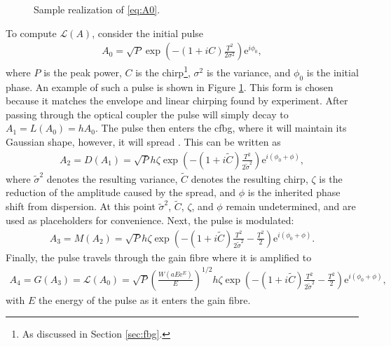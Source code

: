 \begin{figure}[tbp]
\centering

\caption{Sample realization of \eqref{eq:A0}.}
\label{fig:samplegauss}
\end{figure}

To compute $\mathcal{L}(A)$, consider the initial pulse
\begin{align}
	A_0 = \sqrt{P} \exp \left( -(1 + iC) \frac{T^2}{2 \sigma^2} \right) \textrm{e}^{i \phi_0},
\label{eq:A0}
\end{align}
where $P$ is the peak power, $C$ is the chirp\footnote{As discussed in Section \ref{sec:fbg}.}, $\sigma^2$ is the variance, and $\phi_0$ is the initial phase. An example of such a pulse is shown in Figure \ref{fig:samplegauss}. This form is chosen because it matches the envelope and linear chirping found by experiment. After passing through the optical coupler the pulse will simply decay to $A_1 = L(A_0) = h A_0$. The pulse then enters the \gls{cfbg}, where it will maintain its Gaussian shape, however, it will spread \cite{agrawal2013, ferreira, silfvast}. This can be written as
\begin{align}
A_2 = D(A_1) = \sqrt{P} h \zeta \exp \left( -(1 + i \widetilde{C}) \frac{T^2}{2 \widetilde{\sigma}^2} \right) \textrm{e}^{i(\phi_0 + \phi)},
\end{align}
where $\widetilde{\sigma}^2$ denotes the resulting variance, $\widetilde{C}$ denotes the resulting chirp, $\zeta$ is the reduction of the amplitude caused by the spread, and $\phi$ is the inherited phase shift from dispersion. At this point $\widetilde{\sigma}^2$, $\widetilde{C}$, $\zeta$, and $\phi$ remain undetermined, and are used as placeholders for convenience. Next, the pulse is modulated:
\begin{align}
A_3 = M(A_2) = \sqrt{P} h \zeta \exp \left( -(1 + i \widetilde{C}) \frac{T^2}{2 \widetilde{\sigma}^2} - \frac{T^2}{2} \right) \textrm{e}^{i(\phi_0 + \phi)}.
\end{align}
Finally, the pulse travels through the gain fibre where it is amplified to
\begin{align}
A_4 = G(A_3) = \mathcal{L}(A_0) = \sqrt{P} \left( \frac{W(a E \textrm{e}^E)}{E} \right)^{1/2} h \zeta \exp \left( -(1 + i \widetilde{C}) \frac{T^2}{2 \widetilde{\sigma}^2} - \frac{T^2}{2} \right) \textrm{e}^{i(\phi_0 + \phi)},
\label{eq:A4}
\end{align}
with $E$ the energy of the pulse as it enters the gain fibre. \\


